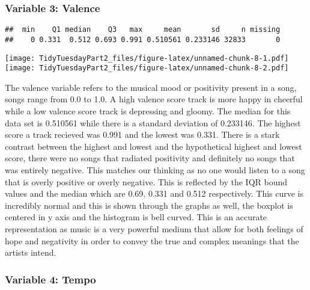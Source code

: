 \documentclass[
]{article}
\newenvironment{Shaded}{\begin{snugshade}}{\end{snugshade}}
\newcommand{\KeywordTok}[1]{\textcolor[rgb]{0.13,0.29,0.53}{\textbf{#1}}}
\newcommand{\NormalTok}[1]{#1}
\newcommand{\OperatorTok}[1]{\textcolor[rgb]{0.81,0.36,0.00}{\textbf{#1}}}
\newcommand{\StringTok}[1]{\textcolor[rgb]{0.31,0.60,0.02}{#1}}
\begin{document}
\hypertarget{variable-3-valence}{%
\subsubsection{Variable 3: Valence}\label{variable-3-valence}}

\begin{Shaded}
\end{Shaded}

\begin{verbatim}
##  min    Q1 median    Q3   max     mean       sd     n missing
##    0 0.331  0.512 0.693 0.991 0.510561 0.233146 32833       0
\end{verbatim}

\texttt{[image: TidyTuesdayPart2\_files/figure-latex/unnamed-chunk-8-1.pdf]}
\texttt{[image: TidyTuesdayPart2\_files/figure-latex/unnamed-chunk-8-2.pdf]}

The valence variable refers to the musical mood or positivity present in
a song, songs range from 0.0 to 1.0. A high valence score track is more
happy in cheerful while a low valence score track is depressing and
gloomy. The median for this data set is 0.510561 while there is a
standard deviation of 0.233146. The highest score a track recieved was
0.991 and the lowest was 0.331. There is a stark contrast between the
highest and lowest and the hypothetical highest and lowest score, there
were no songs that radiated positivity and definitely no songs that was
entirely negative. This matches our thinking as no one would listen to a
song that is overly positive or overly negative. This is reflected by
the IQR bound values and the median which are 0.69, 0.331 and 0.512
respectively. This curve is incredibly normal and this is shown through
the graphs as well, the boxplot is centered in y axis and the histogram
is bell curved. This is an accurate representation as music is a very
powerful medium that allow for both feelings of hope and negativity in
order to convey the true and complex meanings that the artists intend.

\hypertarget{variable-4-tempo}{%
\subsubsection{Variable 4: Tempo}\label{variable-4-tempo}}
\end{document}
